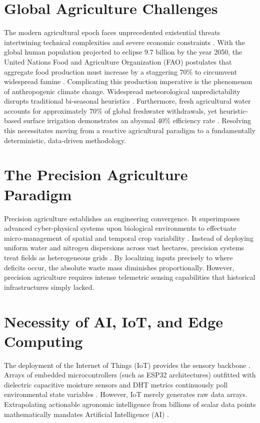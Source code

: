 \documentclass[12pt, a4paper]{report}
\begin{document}
\section{Global Agriculture Challenges}
The modern agricultural epoch faces unprecedented existential threats intertwining technical complexities and severe economic constraints \cite{r1}. With the global human population projected to eclipse 9.7 billion by the year 2050, the United Nations Food and Agriculture Organization (FAO) postulates that aggregate food production must increase by a staggering 70\% to circumvent widespread famine \cite{r2}. Complicating this production imperative is the phenomenon of anthropogenic climate change. Widespread meteorological unpredictability disrupts traditional bi-seasonal heuristics \cite{r3}. Furthermore, fresh agricultural water accounts for approximately 70\% of global freshwater withdrawals, yet heuristic-based surface irrigation demonstrates an abysmal 40\% efficiency rate \cite{r4}. Resolving this necessitates moving from a reactive agricultural paradigm to a fundamentally deterministic, data-driven methodology.

\section{The Precision Agriculture Paradigm}
Precision agriculture establishes an engineering convergence. It superimposes advanced cyber-physical systems upon biological environments to effectuate micro-management of spatial and temporal crop variability \cite{r5}. Instead of deploying uniform water and nitrogen dispersions across vast hectares, precision systems treat fields as heterogeneous grids \cite{r6}. By localizing inputs precisely to where deficits occur, the absolute waste mass diminishes proportionally. However, precision agriculture requires intense telemetric sensing capabilities that historical infrastructures simply lacked.

\section{Necessity of AI, IoT, and Edge Computing}
The deployment of the Internet of Things (IoT) provides the sensory backbone \cite{r7}. Arrays of embedded microcontrollers (such as ESP32 architectures) outfitted with dielectric capacitive moisture sensors and DHT metrics continuously poll environmental state variables \cite{r8}. However, IoT merely generates raw data arrays. Extrapolating actionable agronomic intelligence from billions of scalar data points mathematically mandates Artificial Intelligence (AI) \cite{r9}. 
\end{document}
